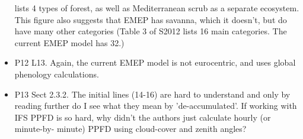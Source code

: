\documentclass{scrartcl}
\begin{document}
\begin{itemize}
{lists 4 types of forest, as well as Mediterranean scrub as a separate ecosystem.
This figure also suggests that EMEP has savanna, which it doesn’t, but do have
many other categories (Table 3 of S2012 lists 16 main categories. The current
EMEP model has 32.)}
\item {\color{blue}P12 L13. Again, the current EMEP model is not eurocentric, and uses global
phenology calculations.}
\item {\color{blue}P13 Sect 2.3.2. The initial lines (14-16) are hard to understand and only by
reading further do I see what they mean by ’de-accumulated’. If working with
IFS PPFD is so hard, why didn’t the authors just calculate hourly (or minute-by-
minute) PPFD using cloud-cover and zenith angles?}

\end{itemize}
\newpage
\end{document}
